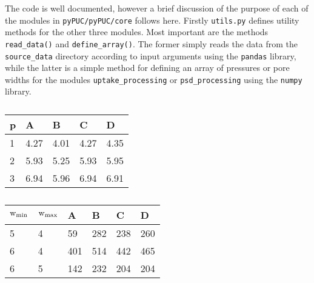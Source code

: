 The code is well documented, however a brief discussion of the purpose of each of the modules in \verb|pyPUC/pyPUC/core| follows here. Firstly \verb|utils.py| defines utility methods for the other three modules. Most important are the methods \verb|read_data()| and \verb|define_array()|. The former simply reads the data from the \verb|source_data| directory according to input arguments using the \verb|pandas| library,\citep{pandas2010} while the latter is a simple method for defining an array of pressures or pore widths for the modules \verb|uptake_processing| or \verb|psd_processing| using the \verb|numpy| library.\citep{numpy2022} 

\begin{table}[b!]
\centering
{}
    \begin{subtable}{.5\linewidth}
      \centering
        \caption{}
        \begin{tabular}{l|l|l|l|l}
            p & A & B & C & D \\
            \midrule
            1 & 4.27 & 4.01 & 4.27 & 4.35 \\
            2 & 5.93 & 5.25 & 5.93 & 5.95 \\
            3 & 6.94 & 5.96 & 6.94 & 6.91 \\
        \end{tabular}
    \label{tb:loading_output}
    \end{subtable}%
    \begin{subtable}{.5\linewidth}
      \centering
        \caption{}
        \begin{tabular}{l|l|l|l|l|l}
            $\rm w_{min}$ & $\rm w_{max}$ & A & B & C & D \\
            \midrule
            5 & 4 & 59 & 282 & 238 & 260 \\
            6 & 4 & 401 & 514 & 442 & 465 \\
            6 & 5 & 142 & 232 & 204	& 204 \\
        \end{tabular}
    \label{tb:param_output}
    \end{subtable} 
\label{tb:loading_param_outputs}


\end{table}
